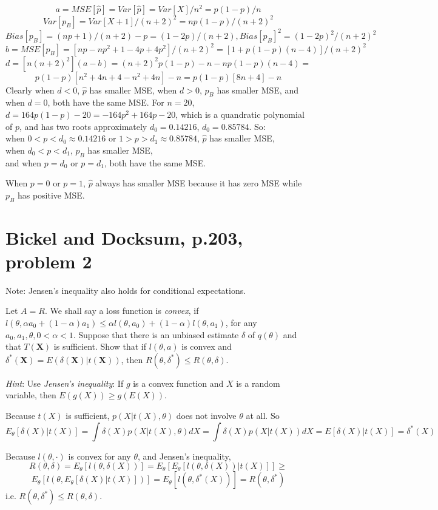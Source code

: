 $$
a = MSE[\hat{p}] = Var[\hat{p}] = Var[X] / n^2 = p(1-p)/n
$$
$$
Var[{p}_B] = Var[X+1] / (n+2)^2 = np(1-p)/(n+2)^2
$$
$$
Bias[{p}_B] = (np+1)/(n+2)-p
= (1-2p)/(n+2),
Bias[{p}_B]^2 = (1-2p)^2/(n+2)^2
$$
$$
b = MSE[{p}_B] = [np-np^2+1-4p+4p^2]/(n+2)^2
=[1+p(1-p)(n-4)]/(n+2)^2
$$
$$
d = [n(n+2)^2](a-b) = (n+2)^2 p(1-p) - n - np(1-p)(n-4) =
$$
$$
p(1-p)[n^2+4n+4-n^2+4n] - n =
p(1-p)[8n+4] - n
$$
Clearly when $d<0$, $\hat{p}$ has smaller MSE,
when $d>0$, $p_B$ has smaller MSE,
and when $d=0$, both have the same MSE.
For $n=20$, $d=164p(1-p)-20 = -164p^2 + 164p - 20$, which is a quandratic polynomial of $p$, and has two roots approximately $d_0=0.14216$, $d_0=0.85784$. So:\\
when $0 < p < d_0 \approx 0.14216$ or $1 > p > d_1 \approx 0.85784$, $\hat{p}$ has smaller MSE, \\
when $d_0 < p < d_1$, $p_B$ has smaller MSE,\\
and when $p=d_0$ or $p=d_1$, both have the same MSE.

When $p=0$ or $p=1$, $\hat{p}$ always has smaller MSE because it has zero MSE while $p_B$ has positive MSE.

\section{Bickel and Docksum, p.203, problem 2}
\ProbS
Note: Jensen's inequality also holds for conditional expectations.

Let $A=R$. We shall say a loss function is \emph{convex}, if
$l(\theta, \alpha a_0 + (1-\alpha)a_1) \leq
\alpha l(\theta, a_0) + (1-\alpha)l(\theta, a_1)$,
for any $a_0, a_1, \theta, 0<\alpha<1$.
Suppose that there is an unbiased estimate $\delta$ of $q(\theta)$
and that $T(\mathbf{X})$ is sufficient.
Show that if $l(\theta, a)$ is convex and
$\delta^{*}(\mathbf{X}) = E(\delta(\mathbf{X}) | t(\mathbf{X}))$,
then $R(\theta, \delta^{*}) \leq R(\theta, \delta)$.

\emph{Hint}: Use \emph{Jensen's inequality}: If $g$ is a convex function and $X$ is a random variable, then $E(g(X)) \geq g(E(X))$.
\ProbE

Because $t(X)$ is sufficient, $p(X | t(X), \theta)$ does not involve $\theta$ at all. So
$$
E_{\theta}[\delta(X) | t(X)] =
\int \delta(X)p(X | t(X), \theta) dX =
\int \delta(X)p(X | t(X)) dX =
E[ \delta(X) | t(X) ] =
\delta^*(X)
$$

Because $l(\theta, \cdot)$ is convex for any $\theta$, and Jensen's inequality,
$$
R(\theta, \delta) =
E_\theta[l(\theta, \delta(X))] =
E_\theta[ E_\theta[l(\theta, \delta(X)) | t(X)] ] \geq
$$
$$
E_\theta[l(\theta, E_\theta[\delta(X) | t(X)])] =
E_\theta[l(\theta, \delta^*(X))] =
R(\theta, \delta^*)
$$
i.e. $R(\theta, \delta^*) \leq R(\theta, \delta)$.


